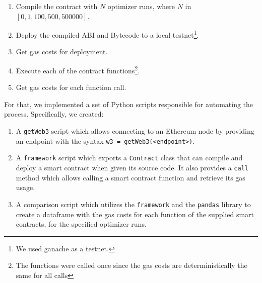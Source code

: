 \begin{enumerate}
  \item Compile the contract with $N$ optimizer runs, where $N$ in $[0, 1, 100, 500, 500000]$.
  \item Deploy the compiled ABI and Bytecode to a local testnet\footnote{We used ganache as a testnet.}.
  \item Get gas costs for deployment.
  \item Execute each of the contract functions\footnote{The functions were called once since the gas costs are deterministically the same for all calls}.
  \item Get gas costs for each function call.
\end{enumerate}

For that, we implemented a set of Python scripts responsible for automating the process. Specifically, we created:
\begin{enumerate}
  \item A \texttt{getWeb3} script which allows connecting to an Ethereum node by providing an endpoint with the syntax \texttt{w3 = getWeb3(<endpoint>)}.
  \item A \texttt{framework} script which exports a \texttt{Contract} class that can compile and deploy a smart contract when given its source code. It also provides a \texttt{call} method which allows calling a smart contract function and retrieve its gas usage. 
  \item A comparison script which utilizes the \texttt{framework} and the \texttt{pandas} library to create a dataframe with the gas costs for each function of the supplied smart contracts, for the specified optimizer runs.
\end{enumerate}